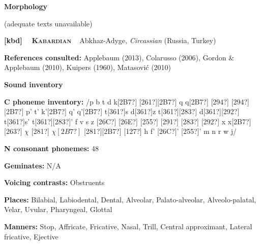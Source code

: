 \begin{styleBody}
\textbf{Morphology}
\end{styleBody}

\begin{styleBody}
(adequate texts unavailable)
\end{styleBody}

\clearpage\begin{styleBody}
\textbf{[kbd] }\ \ \textbf{\textsc{Kabardian}}\textbf{\ \ }Abkhaz-Adyge, \textit{Circassian} (Russia, Turkey)
\end{styleBody}

\begin{styleBody}
\textbf{References consulted: }Applebaum (2013), Colarusso (2006), Gordon \& Applebaum (2010), Kuipers (1960), Matasović (2010)
\end{styleBody}

\begin{styleBody}
\textbf{Sound inventory}
\end{styleBody}

\begin{styleBody}
\textbf{C phoneme inventory:} /p b t d k[2B7?] [261?][2B7?] q q[2B7?] [294?] [294?][2B7?] p’ t’ k’[2B7?] q’ q’[2B7?] t[361?]s d[361?]z t[361?][283?] d[361?][292?] t[361?]s’ t[361?][283?]’ f v s z [26C?] [26E?] [255?] [291?] [283?] [292?] x x[2B7?] [263?] $\chi $ [281?] $\chi [2B7?]$ [281?][2B7?] [127?] h f' [26C?]’ [255?]' m n r w j/
\end{styleBody}

\begin{styleBody}
\textbf{N consonant phonemes:} 48
\end{styleBody}

\begin{styleBody}
\textbf{Geminates:} N/A
\end{styleBody}

\begin{styleBody}
\textbf{Voicing contrasts:} Obstruents
\end{styleBody}

\begin{styleBody}
\textbf{Places:} Bilabial, Labiodental, Dental, Alveolar, Palato-alveolar, Alveolo-palatal, Velar, Uvular, Pharyngeal, Glottal
\end{styleBody}

\begin{styleBody}
\textbf{Manners:} Stop, Affricate, Fricative, Nasal, Trill, Central approximant, Lateral fricative, Ejective
\end{styleBody}

